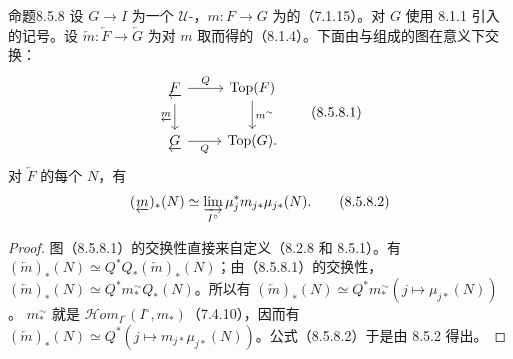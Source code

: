 \begin{SGAresult}{命题}{8.5.8}
设 $G\to I$ 为一个 $\mathcal U$-，$m:F\to G$ 为的（7.1.15）。对 $G$ 使用 8.1.1 引入的记号。设 $\underleftarrow m:\underleftarrow F\to\underleftarrow G$ 为对 $m$ 取而得的（8.1.4）。下面由与组成的图在意义下交换：
\[
\begin{tikzcd}
\underleftarrow F\arrow[r,"Q"]\arrow[d,"\underleftarrow m"']&\operatorname{Top}(F)\arrow[d,"m^\sim"]\\
\underleftarrow G\arrow[r,"Q"']&\operatorname{Top}(G).
\end{tikzcd}\tag{8.5.8.1}
\]
对 $\underleftarrow F$ 的每个 $N$，有
\[
 (\underleftarrow m)_*(N)\simeq
 \varinjlim_{I^\circ}\mu_j^*m_{j*}\mu_{j*}(N).\tag{8.5.8.2}
\]
\end{SGAresult}
\begin{proof}
图（8.5.8.1）的交换性直接来自定义（8.2.8 和 8.5.1）。有 $(\underleftarrow m)_*(N)\simeq Q^*Q_*(\underleftarrow m)_*(N)$；由（8.5.8.1）的交换性，$(\underleftarrow m)_*(N)\simeq Q^*m_*^\sim Q_*(N)$。所以有 $(\underleftarrow m)_*(N)\simeq Q^*m_*^\sim(j\mapsto\mu_{j*}(N))$。 $m_*^\sim$ 就是 $\mathscr{H}\!om_{I^\circ}(I^\circ,m_*)$（7.4.10），因而有 $(\underleftarrow m)_*(N)\simeq Q^*(j\mapsto m_{j*}\mu_{j*}(N))$。公式（8.5.8.2）于是由 8.5.2 得出。
\end{proof}

